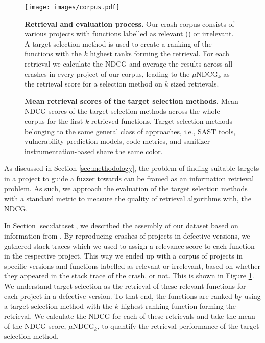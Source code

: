 \begin{figure}[t]
	\centering
	\texttt{[image: images/corpus.pdf]}
	\caption{\textbf{Retrieval and evaluation process.} \normalfont Our crash corpus consists of various projects with functions labelled as relevant (\raisebox{-0.15em}{\FiveStarOpen}) or irrelevant. A target selection method is used to create a ranking of the functions with the $k$ highest ranks forming the retrieval. For each retrieval we calculate the NDCG and average the results across all crashes in every project of our corpus, leading to the $\mu\text{NDCG}_k$ as the retrieval score for a selection method on $k$ sized retrievals.} 
	\label{fig:retrieval-process}
\end{figure}

\cstart
\begin{figure*}[t]
	\begin{center}
		
	\end{center}
	\caption{\textbf{Mean retrieval scores of the target selection methods.} \normalfont Mean NDCG scores of the target selection methods across the whole corpus for the first $k$ retrieved functions. Target selection methods belonging to the same general class of approaches, i.e., SAST tools, vulnerability prediction models, code metrics, and sanitizer instrumentation-based share the same color.}
	\label{fig:mean-gains}
\end{figure*}
\cend

As discussed in Section \ref{sec:methodology}, the problem of finding suitable targets in a project to guide a fuzzer towards can be framed as an information retrieval problem. As such, we approach the evaluation of the target selection methods with a standard metric to measure the quality of retrieval algorithms with, the NDCG.

In Section \ref{sec:dataset}, we described the assembly of our dataset based on information from \ossfuzz{}.
By reproducing crashes of projects in defective versions, we gathered stack traces which we used
to assign a relevance score to each function in the respective project. This way we ended up with a corpus
of projects in specific versions and functions labelled as relevant or irrelevant, based on whether they appeared in the stack trace of the crash, or not. This is shown in Figure \ref{fig:retrieval-process}.  We understand target selection as the retrieval of these relevant functions for each project in a defective version. To that end, the functions are ranked by using a target selection method with the $k$ highest ranking function forming the retrieval. We calculate the NDCG for each of these retrievals and take the mean of the NDCG score, $\mu\text{NDCG}_k$, to quantify the retrieval performance of the target selection method.


